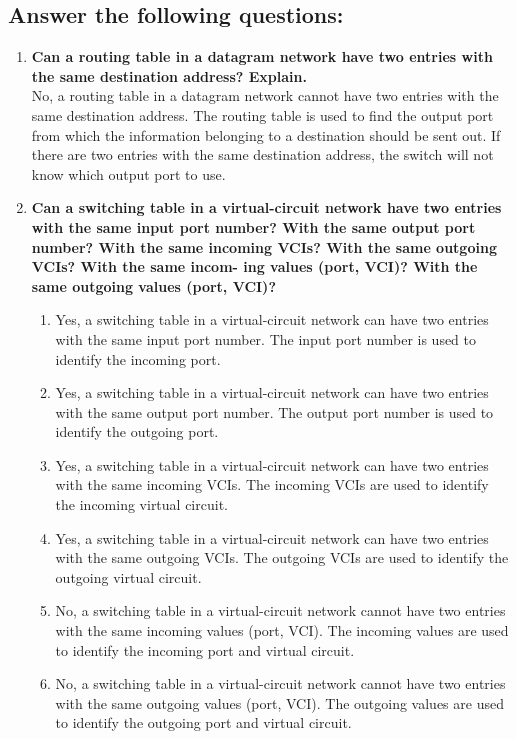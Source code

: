 \documentclass{article}
\begin{document}
\subsection{Answer the following questions:}
\begin{enumerate}
	\item \textbf{ Can a routing table in a datagram network have two entries with the same
		      destination address? Explain.} \\
	      No, a routing table in a datagram network cannot have two entries with the same destination address. The routing table is used to find the output port from which the information belonging to a destination should be sent out. If there are two entries with the same destination address, the switch will not know which output port to use.

	\item \textbf{ Can a switching table in a virtual-circuit network have two entries with the
		      same input port number? With the same output port number? With the
		      same incoming VCIs? With the same outgoing VCIs? With the same incom-
		      ing values (port, VCI)? With the same outgoing values (port, VCI)?}
	      \begin{enumerate}
		      \item Yes, a switching table in a virtual-circuit network can have two entries with the same input port number. The input port number is used to identify the incoming port.
		      \item Yes, a switching table in a virtual-circuit network can have two entries with the same output port number. The output port number is used to identify the outgoing port.
		      \item Yes, a switching table in a virtual-circuit network can have two entries with the same incoming VCIs. The incoming VCIs are used to identify the incoming virtual circuit.
		      \item Yes, a switching table in a virtual-circuit network can have two entries with the same outgoing VCIs. The outgoing VCIs are used to identify the outgoing virtual circuit.
		      \item No, a switching table in a virtual-circuit network cannot have two entries with the same incoming values (port, VCI). The incoming values are used to identify the incoming port and virtual circuit.
		      \item No, a switching table in a virtual-circuit network cannot have two entries with the same outgoing values (port, VCI). The outgoing values are used to identify the outgoing port and virtual circuit.
	      \end{enumerate}
\end{enumerate}
\end{document}
